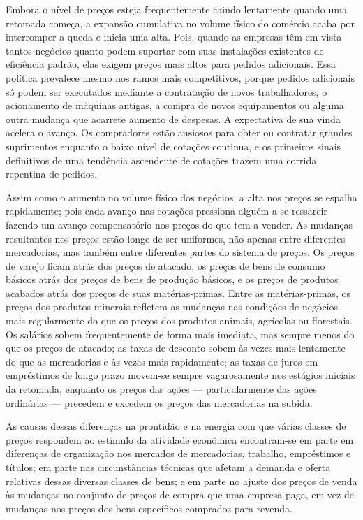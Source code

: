 \documentclass[12pt]{article}
\begin{document}
Embora o nível de preços esteja frequentemente caindo lentamente quando uma retomada começa, a expansão cumulativa no volume físico do comércio acaba por interromper a queda e inicia uma alta. Pois, quando as empresas têm em vista tantos negócios quanto podem suportar com suas instalações existentes de eficiência padrão, elas exigem preços mais altos para pedidos adicionais. Essa política prevalece mesmo nos ramos mais competitivos, porque pedidos adicionais só podem ser executados mediante a contratação de novos trabalhadores, o acionamento de máquinas antigas, a compra de novos equipamentos ou alguma outra mudança que acarrete aumento de despesas. A expectativa de sua vinda acelera o avanço. Os compradores estão ansiosos para obter ou contratar grandes suprimentos enquanto o baixo nível de cotações continua, e os primeiros sinais definitivos de uma tendência ascendente de cotações trazem uma corrida repentina de pedidos.

Assim como o aumento no volume físico dos negócios, a alta nos preços se espalha rapidamente; pois cada avanço nas cotações pressiona alguém a se ressarcir fazendo um avanço compensatório nos preços do que tem a vender. As mudanças resultantes nos preços estão longe de ser uniformes, não apenas entre diferentes mercadorias, mas também entre diferentes partes do sistema de preços. Os preços de varejo ficam atrás dos preços de atacado, os preços de bens de consumo básicos atrás dos preços de bens de produção básicos, e os preços de produtos acabados atrás dos preços de suas matérias-primas. Entre as matérias-primas, os preços dos produtos minerais refletem as mudanças nas condições de negócios mais regularmente do que os preços dos produtos animais, agrícolas ou florestais. Os salários sobem frequentemente de forma mais imediata, mas sempre menos do que os preços de atacado; as taxas de desconto sobem às vezes mais lentamente do que as mercadorias e às vezes mais rapidamente; as taxas de juros em empréstimos de longo prazo movem-se sempre vagarosamente nos estágios iniciais da retomada, enquanto os preços das ações — particularmente das ações ordinárias — precedem e excedem os preços das mercadorias na subida.

As causas dessas diferenças na prontidão e na energia com que várias classes de preços respondem ao estímulo da atividade econômica encontram-se em parte em diferenças de organização nos mercados de mercadorias, trabalho, empréstimos e títulos; em parte nas circunstâncias técnicas que afetam a demanda e oferta relativas dessas diversas classes de bens; e em parte no ajuste dos preços de venda às mudanças no conjunto de preços de compra que uma empresa paga, em vez de mudanças nos preços dos bens específicos comprados para revenda.
\end{document}
